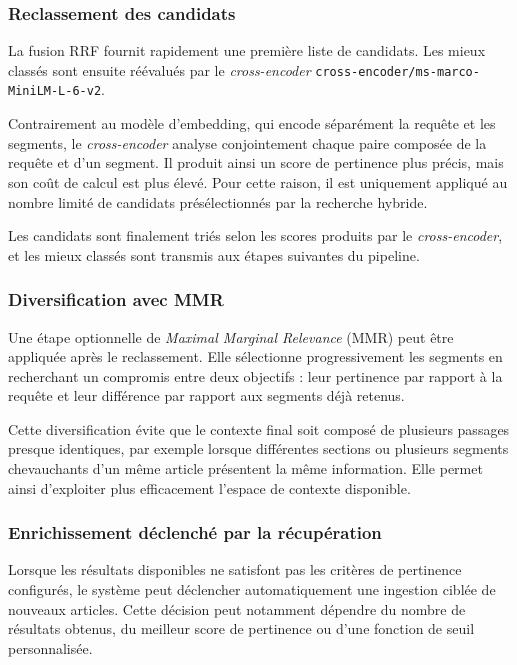 \subsubsection{Reclassement des candidats}

La fusion RRF fournit rapidement une première liste de candidats. Les mieux classés
sont ensuite réévalués par le \emph{cross-encoder}
\texttt{cross-encoder/ms-marco-MiniLM-L-6-v2}.

Contrairement au modèle d'embedding, qui encode séparément la requête et les segments,
le \emph{cross-encoder} analyse conjointement chaque paire composée de la requête et
d'un segment. Il produit ainsi un score de pertinence plus précis, mais son coût de
calcul est plus élevé. Pour cette raison, il est uniquement appliqué au nombre limité
de candidats présélectionnés par la recherche hybride.

Les candidats sont finalement triés selon les scores produits par le
\emph{cross-encoder}, et les mieux classés sont transmis aux étapes suivantes du
pipeline.

\subsubsection{Diversification avec MMR}

Une étape optionnelle de \emph{Maximal Marginal Relevance} (MMR) peut être appliquée
après le reclassement. Elle sélectionne progressivement les segments en recherchant
un compromis entre deux objectifs : leur pertinence par rapport à la requête et leur
différence par rapport aux segments déjà retenus.

Cette diversification évite que le contexte final soit composé de plusieurs passages
presque identiques, par exemple lorsque différentes sections ou plusieurs segments
chevauchants d'un même article présentent la même information. Elle permet ainsi
d'exploiter plus efficacement l'espace de contexte disponible.

\subsubsection{Enrichissement déclenché par la récupération}

Lorsque les résultats disponibles ne satisfont pas les critères de pertinence
configurés, le système peut déclencher automatiquement une ingestion ciblée de
nouveaux articles. Cette décision peut notamment dépendre du nombre de résultats
obtenus, du meilleur score de pertinence ou d'une fonction de seuil personnalisée.

